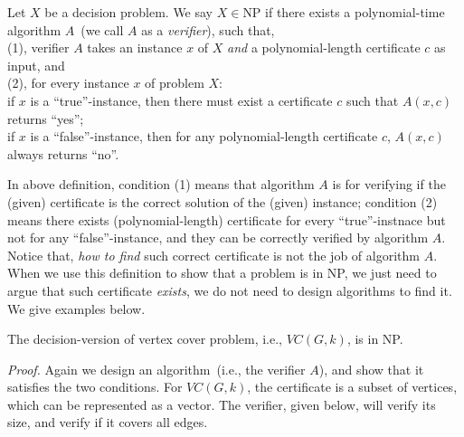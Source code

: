 \begin{definition}[NP]
Let $X$ be a decision problem. We say $X\in \textrm{NP}$ if there exists a polynomial-time algorithm $A$~(we call $A$ as a \emph{verifier}), such that,\\
	(1), verifier $A$ takes an instance $x$ of $X$ \emph{and} a polynomial-length certificate $c$ as input, and \\
	(2), for every instance $x$ of problem $X$: \\
	\hspace*{0.2cm} if $x$ is a ``true''-instance, then there must exist a certificate $c$ such that $A(x,c)$ returns ``yes'';\\
	\hspace*{0.2cm} if $x$ is a ``false''-instance, then for any polynomial-length certificate $c$, $A(x,c)$ always returns ``no''.
\end{definition}

In above definition, condition (1) means that algorithm $A$ is for verifying if the (given) certificate is the correct solution of the (given) instance;
condition (2) means there exists (polynomial-length) certificate
for every ``true''-instnace but not for any ``false''-instance, and they can be correctly verified by algorithm $A$.
Notice that, \emph{how to find} such correct certificate is not the job of algorithm $A$.
When we use this definition to show that a problem is in NP, we just need to argue that
such certificate \emph{exists}, we do not need to design algorithms to find it.
We give examples below.

\begin{fact}
The decision-version of vertex cover problem, i.e., $VC(G, k)$, is in NP.
\end{fact}

\emph{Proof.} Again we design an algorithm~(i.e., the verifier $A$), and show that it satisfies the two
conditions. For $VC(G, k)$, the certificate is a subset of vertices, which
can be represented as a vector.
The verifier, given below, will verify its size, and verify if it covers all edges.

\begin{algorithmblock}[0.8\textwidth]
	\xxx
	\xxx
	\xxx
	\xxx
	\xxx
\end{algorithmblock}

